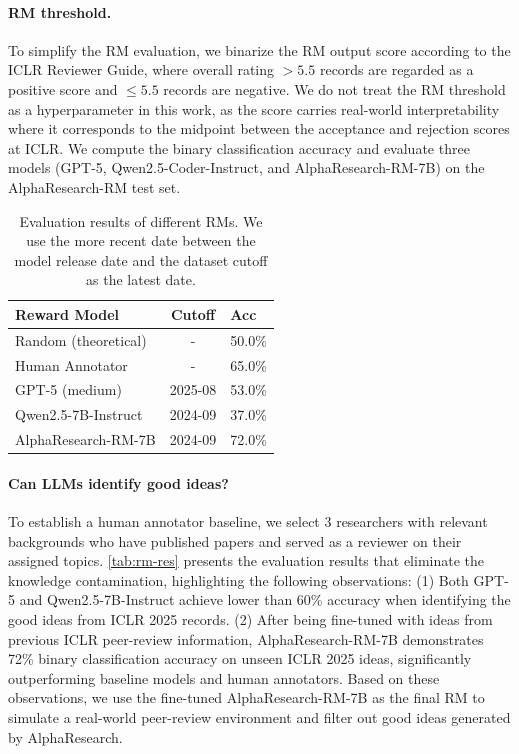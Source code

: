 \paragraph{RM threshold.}
To simplify the RM evaluation, we binarize the RM output score according to the ICLR Reviewer Guide, where overall rating $> 5.5$ records are regarded as a positive score and $\leq 5.5$ records are negative. We do not treat the RM threshold as a hyperparameter in this work, as the score carries real-world interpretability where it corresponds to the midpoint between the acceptance and rejection scores at ICLR.
We compute the binary classification accuracy and evaluate three models (GPT-5, Qwen2.5-Coder-Instruct, and AlphaResearch-RM-7B) on the AlphaResearch-RM test set. 


\begin{table}
  \centering
   \label{tab:rm-res}
  \begin{tabular}{l|cl}
  \toprule
  \textbf{Reward Model} & \textbf{Cutoff} & \textbf{Acc} \\
  \midrule
  Random (theoretical) & - & 50.0\% \\
  Human Annotator & - & 65.0\% \\
  \midrule
    GPT-5 (medium) & 2025-08 & 53.0\% \\
  Qwen2.5-7B-Instruct & 2024-09 & 37.0\% \\
  AlphaResearch-RM-7B & 2024-09 & 72.0\% \\
  \bottomrule
  \end{tabular}
\caption{Evaluation results of different RMs. We use the more recent date between the model release date and the dataset cutoff as the latest date.}
\end{table}

\paragraph{Can LLMs identify good ideas?} To establish a human annotator baseline, we select 3 researchers with relevant backgrounds who have published papers and served as a reviewer on their assigned topics.
\autoref{tab:rm-res} presents the evaluation results that eliminate the knowledge contamination, highlighting the following observations: (1) Both GPT-5 and Qwen2.5-7B-Instruct achieve lower than 60\% accuracy when identifying the good ideas from ICLR 2025 records.
(2) After being fine-tuned with ideas from previous ICLR peer-review information, AlphaResearch-RM-7B demonstrates 72\%
binary classification accuracy on unseen ICLR 2025 ideas, significantly outperforming baseline models and human annotators. 
Based on these observations, we use the fine-tuned AlphaResearch-RM-7B as the final RM to simulate a real-world peer-review environment and filter out good ideas generated by AlphaResearch.

